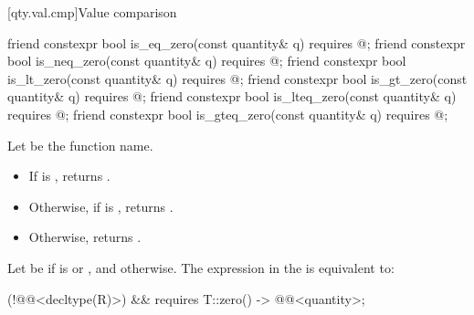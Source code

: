 [qty.val.cmp]{Value comparison}

\begin{itemdecl}
friend constexpr bool is_eq_zero(const quantity& q) requires @\seebelownc@;
friend constexpr bool is_neq_zero(const quantity& q) requires @\seebelownc@;
friend constexpr bool is_lt_zero(const quantity& q) requires @\seebelownc@;
friend constexpr bool is_gt_zero(const quantity& q) requires @\seebelownc@;
friend constexpr bool is_lteq_zero(const quantity& q) requires @\seebelownc@;
friend constexpr bool is_gteq_zero(const quantity& q) requires @\seebelownc@;
\end{itemdecl}

\begin{itemdescr}
\pnum
Let  be the function name.

\pnum
\returns
\begin{itemize}
\item
If  is , returns .
\item
Otherwise, if  is , returns .
\item
Otherwise, returns .
\end{itemize}

\pnum
\remarks
Let  be
 if  is  or , and
 otherwise.
The expression in the  is equivalent to:
\begin{codeblock}
(!@@<decltype(R)>) && requires {
  { T::zero() } -> @@<quantity>;
}
\end{codeblock}
\end{itemdescr}


